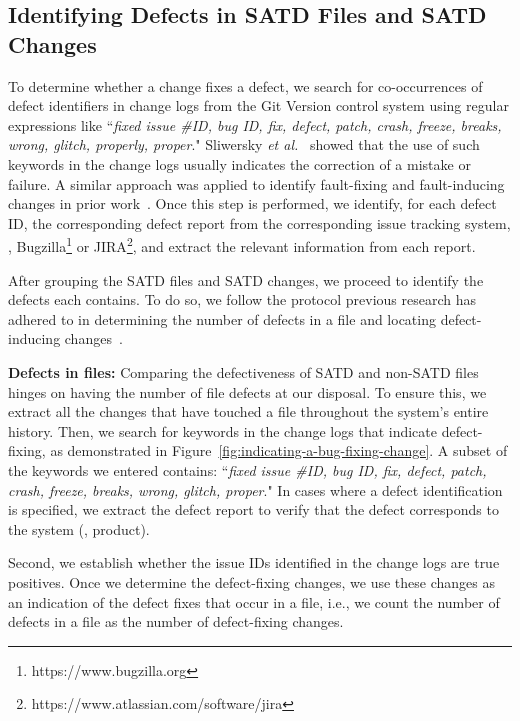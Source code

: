 \subsection{Identifying Defects in SATD Files and SATD Changes}
\label{bugs}
To determine whether a change fixes a defect, we search for co-occurrences of defect identifiers in change logs from the Git Version control system using regular expressions like ``\textit{fixed issue \#ID, bug ID, fix, defect, patch, crash,  freeze, breaks, wrong, glitch, properly, proper}."
Sliwersky \textit{et al.}~\cite{sliwerski-msr-2005} showed that the use of such keywords in the change logs usually indicates the correction of a mistake or failure.
A similar  approach  was applied  to  identify  fault-fixing  and
fault-inducing  changes in  prior work~\cite{Kamei-tse-2013,Kim-tse-2008, sliwerski-msr-2005}. Once this step is performed, we identify, for each defect ID, the corresponding defect report from
the corresponding issue tracking system, \ie{}, Bugzilla\footnote{https://www.bugzilla.org} or JIRA\footnote{https://www.atlassian.com/software/jira}, and extract the relevant information from each report.

After grouping the SATD files and SATD changes, we proceed to identify the defects each contains. To do so, we follow the protocol previous research has adhered to in determining the number of defects in a file and locating defect-inducing changes~\cite{Kamei-tse-2013,Kim-tse-2008, sliwerski-msr-2005}.

\noindent\textbf{Defects in files:} Comparing the defectiveness of SATD and non-SATD files hinges on having the number of file defects at our disposal. To ensure this, we extract all the changes that have touched a file throughout the system's entire history. Then, we search for keywords in the change logs that indicate defect-fixing, as demonstrated in Figure~\ref{fig:indicating-a-bug-fixing-change}. A subset of the keywords we entered contains: ``\textit{fixed issue \#ID, bug ID, fix, defect, patch, crash, freeze, breaks, wrong, glitch, proper}." In cases where a defect identification is specified, we extract the defect report to verify that the defect corresponds to the system (\ie{}, product).

Second, we establish whether the issue IDs identified in the change logs are true positives. Once we determine the defect-fixing changes, we use these changes as an indication of the defect fixes that occur in a file, i.e., we count the number of defects in a file as the number of defect-fixing changes.


